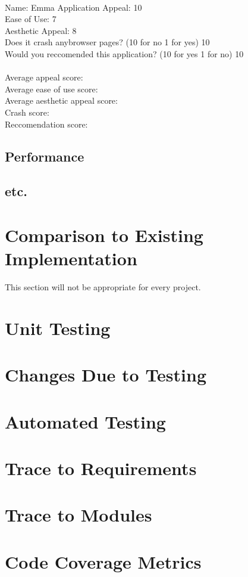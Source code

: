 \documentclass[12pt, titlepage]{article}
\begin{document}
\\
Name: Emma
Application Appeal: 10 \\ 
Ease of Use: 7\\ 
Aesthetic Appeal: 8\\ 
Does it crash anybrowser pages? (10 for no 1 for yes) 10\\ 
Would you reccomended this application? (10 for yes 1 for no) 10\\ 
\\
Average appeal score:  
\\
Average ease of use score: 
\\
Average aesthetic appeal score:
\\
Crash score:
\\
Reccomendation score:
\\
\subsection{Performance}
\subsection{etc.}
	
\section{Comparison to Existing Implementation}	
This section will not be appropriate for every project.
\section{Unit Testing}
\section{Changes Due to Testing}
\section{Automated Testing}
		
\section{Trace to Requirements}
		
\section{Trace to Modules}		
\section{Code Coverage Metrics}
\end{document}
